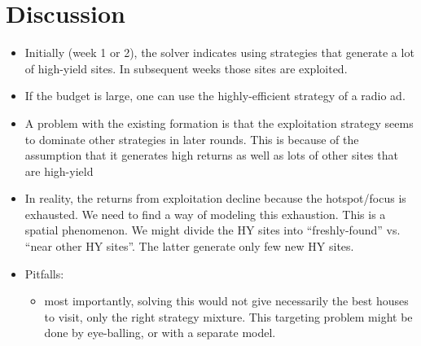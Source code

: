 \documentclass[english]{paper}
\begin{document}
\section{Discussion}
\begin{itemize}
\item Initially (week 1 or 2), the solver indicates using strategies that
generate a lot of high-yield sites. In subsequent weeks those sites
are exploited. 
\item If the budget is large, one can use the highly-efficient strategy
of a radio ad.
\item A problem with the existing formation is that the exploitation strategy
seems to dominate other strategies in later rounds. This is because
of the assumption that it generates high returns as well as lots of
other sites that are high-yield
\item In reality, the returns from exploitation decline because the hotspot/focus
is exhausted. We need to find a way of modeling this exhaustion. This
is a spatial phenomenon. We might divide the HY sites into ``freshly-found''
vs. ``near other HY sites''. The latter generate only few new HY
sites.
\item Pitfalls: 

\begin{itemize}
\item most importantly, solving this would not give necessarily the best
houses to visit, only the right strategy mixture. This targeting problem
might be done by eye-balling, or with a separate model.
\end{itemize}
\end{itemize}
\end{document}
